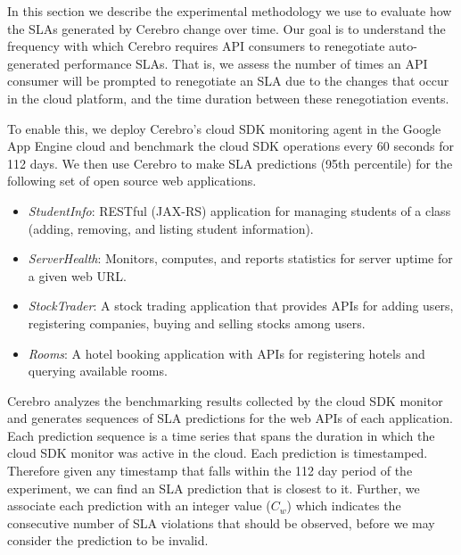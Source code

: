 In this section we describe the experimental methodology we use to evaluate how the SLAs
generated by Cerebro change over time. Our goal is to understand the frequency with
which Cerebro requires API consumers to renegotiate auto-generated performance SLAs. That is,
we assess the number of times an API consumer will be prompted to renegotiate an
SLA due to the changes that occur in the cloud platform, and the time duration
between these renegotiation events.

To enable this, we deploy Cerebro's cloud 
SDK monitoring agent in the Google App Engine cloud and benchmark
the cloud SDK operations every 60 seconds for 112 days. We then use Cerebro
to make SLA predictions (95th percentile) for the following set of open source web applications. 

\begin{itemize}
\item \textit{StudentInfo}: RESTful (JAX-RS) application for managing
students of a class (adding, removing, and listing student information).
\item \textit{ServerHealth}: Monitors, computes, and reports statistics for server
uptime for a given web URL.
\item \textit{StockTrader}: A stock trading application that
provides APIs for adding users, registering companies, buying and selling
stocks among users. 
\item \textit{Rooms}: A hotel booking application with APIs
for registering hotels and querying available rooms.
\end{itemize}

Cerebro analyzes the benchmarking results collected
by the cloud SDK monitor and generates sequences of SLA predictions for the web APIs of each
application. Each prediction sequence
is a time series that spans the duration in which the cloud SDK monitor was active
in the cloud. Each prediction is timestamped. Therefore given any timestamp that falls within the
112 day period of the experiment, we can find an SLA prediction that is closest to it. 
Further, we associate each prediction with an integer value ($C_{w}$) which indicates the consecutive 
number of SLA violations that should be
observed, before we may consider the prediction to be invalid. 


